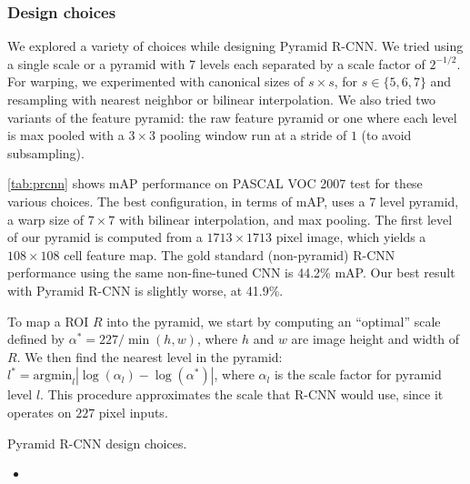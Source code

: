 \subsubsection{Design choices}

We explored a variety of choices while designing Pyramid R-CNN.
We tried using a single scale or a pyramid with 7 levels each separated by a scale factor of $2^{-1/2}$.
For warping, we experimented with canonical sizes of $s \times s$, for $s \in \{5,6,7\}$ and resampling with nearest neighbor or bilinear interpolation.
We also tried two variants of the feature pyramid: the raw feature pyramid or one where each level is max pooled with a $3 \times 3$ pooling window run at a stride of $1$ (to avoid subsampling).

\autoref{tab:prcnn} shows mAP performance on PASCAL VOC 2007 test for these various choices.
The best configuration, in terms of mAP, uses a 7 level pyramid, a warp size of $7 \times 7$ with bilinear interpolation, and max pooling.
The first level of our pyramid is computed from a $1713 \times 1713$ pixel image, which yields a $108 \times 108$ cell feature map.
The gold standard (non-pyramid) R-CNN performance using the same non-fine-tuned CNN is 44.2\% mAP.
Our best result with Pyramid R-CNN is slightly worse, at 41.9\%.

To map a ROI $R$ into the pyramid, we start by computing an ``optimal'' scale defined by $\alpha^* = 227/\min(h,w)$, where $h$ and $w$ are image height and width of $R$.
We then find the nearest level in the pyramid: $l^* = \textrm{argmin}_l |\log(\alpha_l) - \log(\alpha^*)|$, where $\alpha_l$ is the scale factor for pyramid level $l$.
This procedure approximates the scale that R-CNN would use, since it operates on $227$ pixel inputs.

\begin{table}[ht]
\caption{
    Pyramid R-CNN design choices.
}\label{tab:prcnn}

\end{table}

\begin{itemize}
\itemsep1pt\parskip0pt
\item
\end{itemize}



